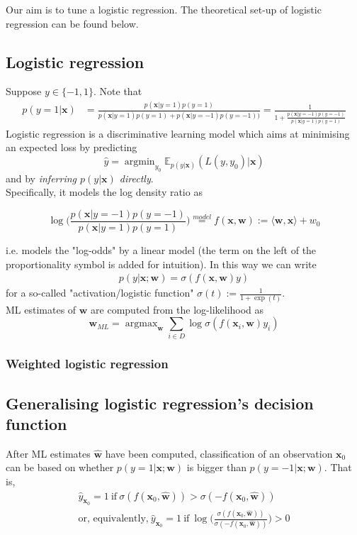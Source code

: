 \documentclass[]{article}
\newcommand{\w}{\mathbf{w}}
\newcommand{\x}{\mathbf{x}}
\begin{document}
Our aim is to tune a logistic regression. The theoretical set-up of logistic regression can be found below.

\subsection{Logistic regression}


Suppose $y\in \{-1,1\}$. Note that
\begin{align}
p(y=1|\x)&=\frac{p(\x|y=1)p(y=1)}{p(\x|y=1)p(y=1)+p(\x|y=-1)p(y=-1))} = \frac{1}{1+\frac{p(\x|y=-1)p(y=-1)}{p(\x|y=1)p(y=1)}}
\end{align}
Logistic regression is a discriminative learning model which aims at minimising an expected loss by predicting 
$$\hat{y}=\operatorname{argmin}_{y_0}\mathbb{E}_{p(y|\x)}(L(y,y_0)|\x)$$
and by \textit{inferring $p(y|\x)$ directly}. \\


Specifically, it models the log density ratio as 

$$\log\Big(\frac{p(\x|y=-1)p(y=-1)}{p(\x|y=1)p(y=1)}\Big)\overset{model}{=}f(\x,\w):=\langle \w,\x \rangle+w_0$$ 

i.e. models the "log-odds"  by a linear model (the term on the left of the proportionality symbol is added for intuition). In this way we can write 
\begin{align}
p(y|\x;\w)=\sigma(f(\x,\w)y)
\end{align}
for a so-called "activation/logistic function" $\sigma(t):=\frac{1}{1+\exp(t)}$.  \\
ML estimates of $\w$ are computed from the log-likelihood as $$\w_{ML}=\operatorname{argmax}_\w\sum_{i\in D}\log\sigma(f(\x_i,\w)y_i)$$

\subsubsection{Weighted logistic regression}

\subsection{Generalising logistic regression's decision function}
\label{app:decision function}

After ML estimates $\hat{\w}$ have been computed, classification of an observation $\x_0$ can be based on whether $p(y=1|\x;\w)$ is bigger than $p(y=-1|\x;\w)$. That is,
\begin{align*}
\hat{y}_{\x_0}=1 \ \text{if} \ \sigma(f(\x_0,\hat{\w}))>\sigma(-f(\x_0,\hat{\w})) \\
\text{or, equivalently,} \
\hat{y}_{\x_0}=1  \ \text{if} \ \log \Big( \frac{\sigma(f(\x_0,\hat{\w}))}{\sigma(-f(\x_0,\hat{\w}))}\Big)>0
\end{align*} 
\end{document}
